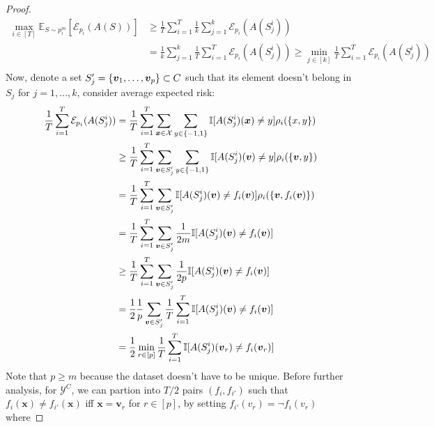 \begin{proof}
    \begin{equation*}
    \begin{aligned}
        \max_{i \in [T]} \mathbb{E}_{S \sim p_i^m}[\mathcal{E}_{p_i}(A(S))] &\ge \frac{1}{T}\sum^T_{i=1} \frac{1}{k}\sum^k_{j=1}\mathcal{E}_{p_i}(A(S^i_j)) \\
        &= \frac{1}{k}\sum^k_{j=1}\frac{1}{T}\sum^T_{i=1} \mathcal{E}_{p_i}(A(S^i_j)) \ge \min_{j \in [k]}\frac{1}{T}\sum^T_{i=1} \mathcal{E}_{p_i}(A(S^i_j)) \\
    \end{aligned}
    \end{equation*}
    Now, denote a set $S'_j = \left\{ \boldsymbol v_1,\dots,\boldsymbol v_p \right\} \subset C$ such that its element doesn't belong in $S_j$ for $j=1,\dots,k$, consider average expected risk:
    \begin{equation*}
    \begin{aligned}
        \frac{1}{T}\sum^T_{i=1} \mathcal{E}_{p_i}(A(S^i_j)) &= \frac{1}{T}\sum^T_{i=1}\sum_{\boldsymbol x \in \mathcal{X}}\sum_{y \in \left\{ -1, 1 \right\}} \mathbb{I}[A(S^i_j)(\boldsymbol x) \ne y] \rho_i(\left\{ x, y \right\})  \\
        &\ge \frac{1}{T}\sum^T_{i=1}\sum_{\boldsymbol v \in S'_j}\sum_{y \in \left\{ -1, 1 \right\}} \mathbb{I}[A(S^i_j)(\boldsymbol v) \ne y] \rho_i(\left\{ \boldsymbol v, y \right\})  \\
        &= \frac{1}{T}\sum^T_{i=1}\sum_{\boldsymbol v\in S'_j} \mathbb{I}[A(S^i_j)(\boldsymbol v) \ne f_i(\boldsymbol v)] \rho_i(\left\{ \boldsymbol v, f_i(\boldsymbol v) \right\})  \\
        &= \frac{1}{T}\sum^T_{i=1}\sum_{\boldsymbol v \in S'_j} \frac{1}{2m} \mathbb{I}[A(S^i_j)(\boldsymbol v) \ne f_i(\boldsymbol v)] \\
        &\ge \frac{1}{T}\sum^T_{i=1}\sum_{\boldsymbol v \in S'_j} \frac{1}{2p} \mathbb{I}[A(S^i_j)(\boldsymbol v) \ne f_i(\boldsymbol v)] \\
        &= \frac{1}{2} \frac{1}{p}\sum_{\boldsymbol v \in S'_j} \frac{1}{T}\sum^T_{i=1}  \mathbb{I}[A(S^i_j)(\boldsymbol v) \ne f_i(\boldsymbol v)] \\
        &= \frac{1}{2} \min_{r\in[p]} \frac{1}{T}\sum^T_{i=1}  \mathbb{I}[A(S^i_j)(\boldsymbol v_r) \ne f_i(\boldsymbol v_r)] \\
    \end{aligned}
    \end{equation*}
    Note that $p\ge m$ because the dataset doesn't have to be unique. Before further analysis, for $\mathcal{Y}^C$, we can partion into $T/2$ pairs $(f_i, f_{i'})$ such that $f_i(\boldsymbol x) \ne f_{i'}(\boldsymbol x)$ iff $\boldsymbol x = \boldsymbol v_r$ for $r\in[p]$, by setting $f_{i'}(v_r) = \neg f_i(v_r)$ where 

\end{proof}
